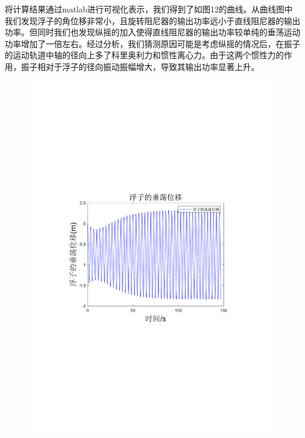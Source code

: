 \documentclass[12pt,utf8]{article}
\begin{document}
将计算结果通过matlab进行可视化表示，我们得到了如图12的曲线。从曲线图中我们发现浮子的角位移非常小，且旋转阻尼器的输出功率远小于直线阻尼器的输出功率。但同时我们也发现纵摇的加入使得直线阻尼器的输出功率较单纯的垂荡运动功率增加了一倍左右。经过分析，我们猜测原因可能是考虑纵摇的情况后，在振子的运动轨道中轴的径向上多了科里奥利力和惯性离心力。由于这两个惯性力的作用，振子相对于浮子的径向振动振幅增大，导致其输出功率显著上升。

\begin{figure}[htbp]
	\centering
	\begin{minipage}{0.45\linewidth}
		\includegraphics[width=0.9\linewidth]{figures/浮子垂荡位移.pdf}
	\end{minipage}
	\begin{minipage}{0.45\linewidth}

\end{minipage}
\end{figure}
\end{document}
